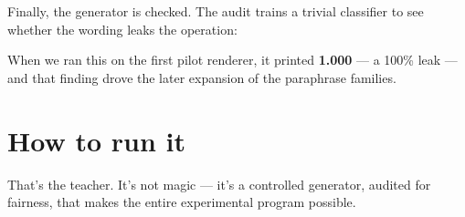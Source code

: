 Finally, the generator is checked. The audit trains a trivial classifier
to see whether the wording leaks the operation:

\begin{Shaded}
\begin{Highlighting}[]
\OperatorTok{=}
\OperatorTok{=}\NormalTok{ vec.fit\_transform([t[}\NormalTok{][}\NormalTok{] }\NormalTok{ tasks])}
\OperatorTok{=}\OperatorTok{=}\NormalTok{)}
\OperatorTok{=}\OperatorTok{=}\NormalTok{)}
\NormalTok{(}\SpecialCharTok{\{}\NormalTok{)   }
\end{Highlighting}
\end{Shaded}

When we ran this on the first pilot renderer, it printed \textbf{1.000}
--- a 100\% leak --- and that finding drove the later expansion of the
paraphrase families.

\section{How to run it}\label{how-to-run-it}

\begin{Shaded}
\begin{Highlighting}[]
\end{Highlighting}
\end{Shaded}

That's the teacher. It's not magic --- it's a controlled generator,
audited for fairness, that makes the entire experimental program
possible.
